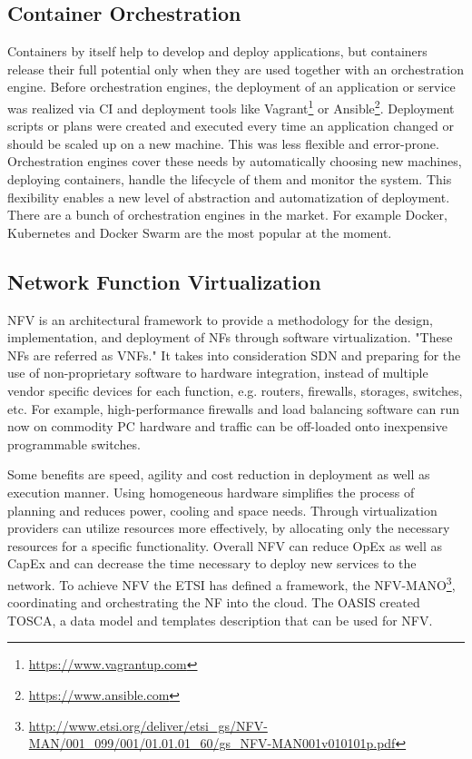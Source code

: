 \subsection{Container Orchestration}
Containers by itself help to develop and deploy applications, but containers release their full potential only when they are used together with an orchestration engine.
Before orchestration engines, the deployment of an application or service was realized via \ac{CI} and deployment tools like Vagrant\footnote{\url{https://www.vagrantup.com}} or Ansible\footnote{\url{https://www.ansible.com}}.
Deployment scripts or plans were created and executed every time an application changed or should be scaled up on a new machine.
This was less flexible and error-prone.
Orchestration engines cover these needs by automatically choosing new machines, deploying containers, handle the lifecycle of them and monitor the system.
This flexibility enables a new level of abstraction and automatization of deployment.
There are a bunch of orchestration engines in the market.
For example Docker, Kubernetes and Docker Swarm are the most popular at the moment.


\subsection{Network Function Virtualization}
\ac{NFV} is an architectural framework to provide a methodology for the design, implementation, and deployment of \acp{NF} through software virtualization.\autocite[cf.][p. 8]{ETSI:NFV:2013}\autocite[cf.]{Rivenes:2014}
"These \acp{NF} are referred as \acp{VNF}."\autocite[p. 8]{ETSI:NFV:2013}
It takes into consideration \ac{SDN} and preparing for the use of non-proprietary software to hardware integration, instead of multiple vendor specific devices for each function, e.g. routers, firewalls, storages, switches, etc.\autocite[cf.]{Rivenes:2014}
For example, high-performance firewalls and load balancing software can run now on commodity PC hardware and traffic can be off-loaded onto inexpensive programmable switches.\autocite[cf.]{Noble:2015}

Some benefits are speed, agility and cost reduction in deployment as well as execution manner.\autocite[cf.]{Noble:2015}
Using homogeneous hardware simplifies the process of planning and reduces power, cooling and space needs.\autocite[cf.]{Noble:2015}
Through virtualization providers can utilize resources more effectively, by allocating only the necessary resources for a specific functionality.\autocite[cf.]{Noble:2015}
Overall \ac{NFV} can reduce \ac{OpEx} as well as \ac{CapEx} and can decrease the time necessary to deploy new services to the network.\autocite[cf.]{Noble:2015}
To achieve \ac{NFV} the \ac{ETSI} has defined a framework, the \ac{NFV-MANO}\footnote{\url{http://www.etsi.org/deliver/etsi_gs/NFV-MAN/001_099/001/01.01.01_60/gs_NFV-MAN001v010101p.pdf}}, coordinating and orchestrating the \ac{NF} into the cloud.
The \ac{OASIS} created \ac{TOSCA}, a data model and templates description that can be used for \ac{NFV}.

